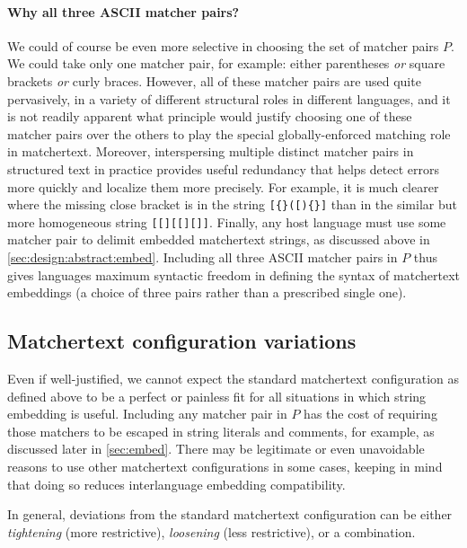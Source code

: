 \paragraph{Why all three ASCII matcher pairs?}

We could of course be even more selective
in choosing the set of matcher pairs $P$.
We could take only one matcher pair, for example:
either parentheses \emph{or} square brackets \emph{or} curly braces.
However, all of these matcher pairs are used quite pervasively,
in a variety of different structural roles in different languages,
and it is not readily apparent what principle would justify
choosing one of these matcher pairs over the others
to play the special globally-enforced matching role in matchertext.
Moreover, interspersing multiple distinct matcher pairs in structured text
in practice provides useful redundancy
that helps detect errors more quickly and localize them more precisely.
For example, it is much clearer where the missing close bracket is
in the string \verb|[{}([){}]|
than in the similar but more homogeneous string \verb|[[][[][]]|.
Finally,
any host language must use some matcher pair
to delimit embedded matchertext strings,
as discussed above in \cref{sec:design:abstract:embed}.
Including all three ASCII matcher pairs in $P$
thus gives languages maximum syntactic freedom
in defining the syntax of matchertext embeddings
(\ie a choice of three pairs rather than a prescribed single one).


\subsection{Matchertext configuration variations}
\label{sec:design:concrete:variations}

Even if well-justified,
we cannot expect the standard matchertext configuration
as defined above to be a perfect or painless fit
for all situations in which string embedding is useful.
Including any matcher pair in $P$ has the cost
of requiring those matchers to be escaped
in string literals and comments, for example,
as discussed later in \cref{sec:embed}.
There may be legitimate or even unavoidable reasons
to use other matchertext configurations in some cases,
keeping in mind that doing so reduces interlanguage embedding compatibility.

In general, deviations from the standard matchertext configuration
can be either \emph{tightening} (more restrictive),
\emph{loosening} (less restrictive), or a combination.


